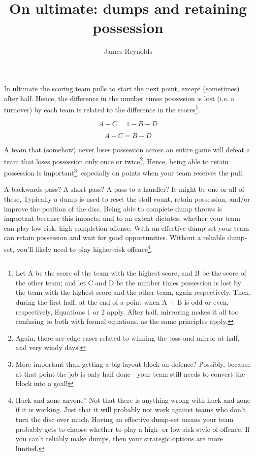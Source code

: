 \documentclass{tufte-handout}
\title{On ultimate: dumps and retaining possession}
\author[James Reynolds]{James Reynolds}
\begin{document}
\maketitle%


In ultimate 
the scoring team 
pulls 
to start the next point, 
except 
(sometimes) 
after half.
Hence, 
the difference
in the number 
times possession
is lost 
(i.e. a turnover)
by each team
is related to 
the difference in 
the scores\footnote{
Let A 
be the score of 
the team with the
highest score,
and  B be the 
score of the 
other team; 
and let 
C and D
be the number
times possession
is lost 
by the team
with the highest score
and the other team, 
again respectively. 
Then, 
during the first half, 
at the end 
of a point when 
A + B is odd
or even, 
respectively, 
Equations 1 
or 2 
apply. 
After half,
mirroring 
makes it all
too confusing 
to both with 
formal equations, 
as the same principles
apply.}. 


\begin{marginfigure}
\begin{equation}
A - C = 1 - B - D
\end{equation}
\end{marginfigure}
\begin{marginfigure}
\begin{equation}
A - C = B - D
\end{equation}
\end{marginfigure}



A team 
that (somehow)
never loses 
possession across
an entire game 
will defeat 
a team 
that loses possession 
only once or twice\footnote{
Again, 
there are edge cases 
related to 
winning the toss and
mirror at half, 
and very windy days.}, 
Hence, 
being able 
to retain possession 
is important\footnote{
More important than getting 
a big layout block on 
defence? Possibly, 
because at that point 
the job 
is only half done - 
your team still 
needs to convert 
the block into a goal!},
especially on 
points when 
your team 
receives 
the pull. 

A backwards pass?  
A short pass?  
A pass 
to a handler?
It might be 
one 
or all 
of these, 
Typically 
a dump 
is used to 
reset the stall count,
retain possession, 
and/or improve 
the position
of the disc.  
Being able 
to complete 
dump throws 
is important because 
this impacts, 
and to an extent dictates, 
whether your team can 
play low-risk, high-completion 
offense. 
With an effective dump-set 
your team can retain possession
and wait for  
good opportunities.  
Without a reliable dump-set, 
you'll likely 
need to play higher-risk 
offence\footnote{
Huck-and-zone anyone? 
Not that there is anything 
wrong with huck-and-zone 
if it is working. 
Just that it 
will
probably
not work 
against teams
who don't turn the disc over much. 
Having an 
effective 
dump-set 
means your team 
probably 
gets to choose 
whether to 
play a
high- or 
low-risk 
style 
of offence. 
If you can't 
reliably 
make dumps, 
then your
strategic options 
are more limited.}.  
\end{document}
